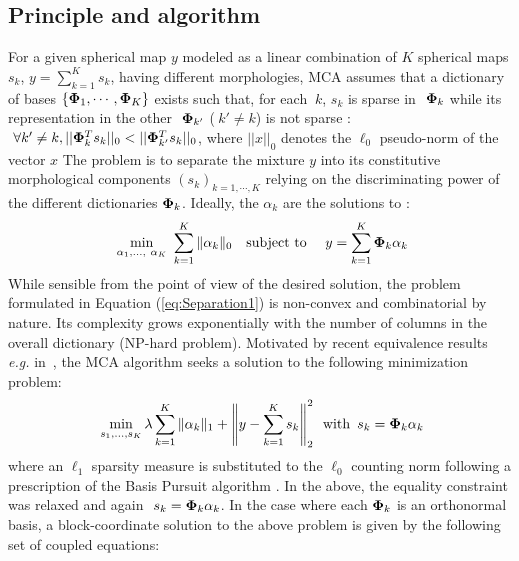  \subsection{Principle and algorithm}
For a given spherical map $y$ modeled as a linear { combination} of $K$ spherical maps $s_k$, $y = \sum_{k=1}^K s_k$, 
having different morphologies, MCA assumes that a dictionary of bases $\{ {\bf \Phi}_1,\cdots,{\bf \Phi}_K\}$ exists 
such that, for each $ ~ k$, $ s_k$ is sparse in $ ~ {\bf \Phi}_k$ while its representation in the other 
$ ~ {\bf \Phi}_{k'}$ ($ ~ k' \ne k$) is not sparse : $ ~ \forall k' \neq k, ||{\bf \Phi}_k^T s_k||_0 < ||{\bf \Phi}_{k'}^T s_k||_0$, 
where $||x||_0$ denotes the $\ell_0$ pseudo-norm of the vector $x$
The problem is to separate the mixture $y$ into its constitutive morphological components $ (s_k)_{k=1,\cdots,K}$ relying 
on the discriminating power of the different dictionaries ${\bf \Phi}_k$. Ideally, the $\alpha_k$ are the solutions { to} :
\begin{equation}\label{eq:Separation1}
 ~ 
\min_{ {\alpha}_1, \dots, ~{\alpha}_K }~\sum_{k=1}^K\|{\alpha}_k\|_0 \quad \mbox{subject to } \quad y= \sum_{k=1}^K  {\bf \Phi}_k {\alpha}_k
\end{equation}
While sensible from the point of view of the desired solution, the problem formulated in Equation (\ref{eq:Separation1}) 
is non-convex and combinatorial by nature. Its complexity grows exponentially with the number of columns in the overall 
dictionary { (NP-hard problem)}. Motivated by recent equivalence results \emph{e.g.} in~\cite{Donoho-Elad}, the MCA 
algorithm seeks a solution to the following minimization problem: 
\begin{equation}\label{mca:model1}
 ~ 
\min_{s_1,\ldots,s_K} \lambda \sum_{k=1}^K  \|\alpha_k\|_1 + \left\|y-\sum_{k=1}^K s_k\right\|_2^2\,\,\,\textrm{with}\,\,\,s_k ={\bf \Phi}_k \alpha_k 
\end{equation}
where an ${ \ell_1}$ sparsity measure is substituted to the $\ell_0$ counting norm following a prescription of 
the Basis Pursuit algorithm \cite{wave:donoho98}. In the above, the equality constraint was relaxed and again 
$ ~ s_k = {\bf \Phi}_k \alpha_k $. In the case where each ${\bf \Phi}_k$ is an orthonormal basis, 
{ a block-coordinate solution to the above problem is given by} the following set of coupled equations:

